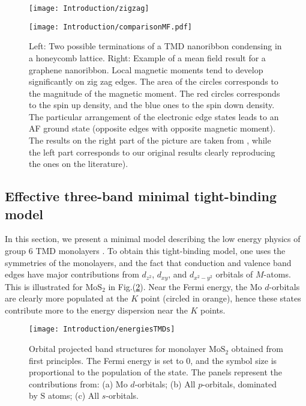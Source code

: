 \begin{figure}[H]
\vspace{-0.5cm}
\hspace{0.5cm}
\begin{minipage}[c]{0.1\textwidth}
\texttt{[image: Introduction/zigzag]}
\end{minipage} \hspace{4.2cm}
\begin{minipage}[c]{0.1\textwidth}
\vspace{0.3cm}
\texttt{[image: Introduction/comparisonMF.pdf]}
\end{minipage}
\vspace{-0.5cm}
 \caption[Zigzag edges of a nanoribbon and magnetism.]{Left: Two possible terminations of a \ac{TMD} nanoribbon condensing in a honeycomb lattice.
Right: Example of a mean field result for a  graphene nanoribbon.
Local magnetic moments tend to develop significantly on zig zag edges.
The area of the circles corresponds to the magnitude of the magnetic moment.
The red circles corresponds to the spin up density, and the blue ones to the spin down density.
The particular arrangement of the electronic edge states leads to an \ac{AF} ground state (opposite edges with opposite magnetic moment). The results on the right part of the picture are taken from \cite{yazyev_emergence_2010}, while the left part corresponds to our original results clearly reproducing the ones on the literature). \label{fig:nanoribbons}}
\end{figure}

\subsection{Effective three-band minimal tight-binding model}\label{subsec:threeband}

In this section, we present a minimal model describing the low energy physics of group 6 \acs{TMD} monolayers \cite{liu_three-band_2013}.
To obtain this tight-binding model, one uses the symmetries of the monolayers, and the fact that conduction and valence band edges have major contributions from $d_{z^2}$, $d_{xy}$, and $d_{x^2 - y^2}$ orbitals of $M$-atoms.
This is illustrated for $\text{Mo}\text{S}_2$ in Fig.(\ref{fig:energiesTMDs}).
Near the Fermi energy, the $\text{Mo}$ $d$-orbitals are clearly more populated at the $K$ point (circled in orange), hence these states contribute more to the energy dispersion near the $K$ points.

\begin{figure}[H]
\centering
\texttt{[image: Introduction/energiesTMDs]}
\caption[Orbital projected band structures for monolayer $\text{Mo}\text{S}_2$ obtained from first principles.]{Orbital projected band structures for monolayer $\text{Mo}\text{S}_2$ obtained from first principles.
The Fermi energy is set to 0, and the symbol size is proportional to the population of the state.
The panels represent the contributions from: (a) $\text{Mo}$ $d$-orbitals; (b) All $p$-orbitals, dominated by $\text{S}$ atoms; (c) All $s$-orbitals. }
\label{fig:energiesTMDs}
\end{figure}	

